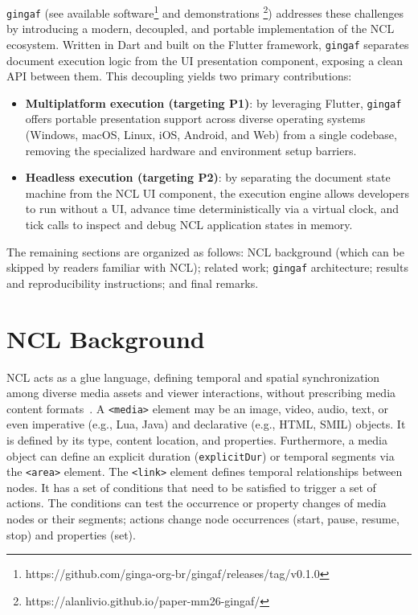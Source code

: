 \documentclass[sigconf]{acmart}
\newcommand{\projectname}{\texttt{gingaf}}
\begin{document}
\projectname{} (see available software\footnote{https://github.com/ginga-org-br/gingaf/releases/tag/v0.1.0} and demonstrations \footnote{https://alanlivio.github.io/paper-mm26-gingaf/}) addresses these challenges by introducing a modern, decoupled, and portable implementation of the NCL ecosystem. Written in Dart and built on the Flutter framework, \projectname{} separates document execution logic from the UI presentation component, exposing a clean API between them. This decoupling yields two primary contributions:
\begin{itemize}
  \item \textbf{Multiplatform execution (targeting P1)}: by leveraging Flutter, \projectname{} offers portable presentation support across diverse operating systems (Windows, macOS, Linux, iOS, Android, and Web) from a single codebase, removing the specialized hardware and environment setup barriers.
  \item \textbf{Headless execution (targeting P2)}: by separating the document state machine from the NCL UI component, the execution engine allows developers to run without a UI, advance time deterministically via a virtual clock, and tick calls to inspect and debug NCL application states in memory.
\end{itemize}

The remaining sections are organized as follows: NCL background (which can be skipped by readers familiar with NCL); related work; \projectname{} architecture; results and reproducibility instructions; and final remarks.

\section{NCL Background}
\label{sec:background}

NCL acts as a glue language, defining temporal and spatial synchronization among diverse media assets and viewer interactions, without prescribing media content formats~\cite{soares_nested_2006_model}. A \texttt{<media>} element may be an image, video, audio, text, or even imperative (e.g., Lua, Java) and declarative (e.g., HTML, SMIL) objects. It is defined by its type, content location, and properties. Furthermore, a media object can define an explicit duration (\texttt{explicitDur}) or temporal segments via the \texttt{<area>} element. The \texttt{<link>} element defines temporal relationships between nodes. It has a set of conditions that need to be satisfied to trigger a set of actions. The conditions can test the occurrence or property changes of media nodes or their segments; actions change node occurrences (start, pause, resume, stop) and properties (set).
\end{document}
